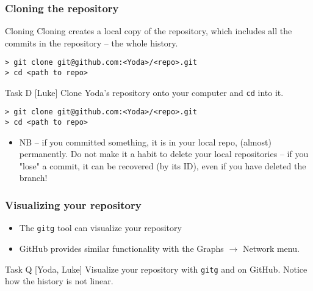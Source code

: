 
\begin{frame}[fragile]

\frametitle{Cloning the repository}

\begin{block}{Cloning}
Cloning creates a local copy of the repository, which includes all the commits in the repository -- the whole history.
\begin{verbatim}
> git clone git@github.com:<Yoda>/<repo>.git
> cd <path to repo>
\end{verbatim}
\end{block}

\begin{block}{Task D [Luke]}
Clone Yoda's repository onto your computer and \texttt{cd} into it.
\begin{verbatim}
> git clone git@github.com:<Yoda>/<repo>.git
> cd <path to repo>
\end{verbatim}
\end{block}

\begin{itemize}
    \item NB -- if you committed something, it is in your local repo, (almost) permanently. Do not make it a habit to delete your local repositories -- if you "lose" a commit, it can be recovered (by its ID), even if you have deleted the branch!
\end{itemize}
	
\end{frame}


\begin{frame}

\frametitle{Visualizing your repository}

\begin{itemize}
	\item The \texttt{gitg} tool can visualize your repository
	\item GitHub provides similar functionality with the Graphs $\rightarrow$ Network menu.
\end{itemize}

\begin{block}{Task Q [Yoda, Luke]}
	Visualize your repository with \texttt{gitg} and on GitHub. Notice how the history is not linear. 
\end{block}

\end{frame}

